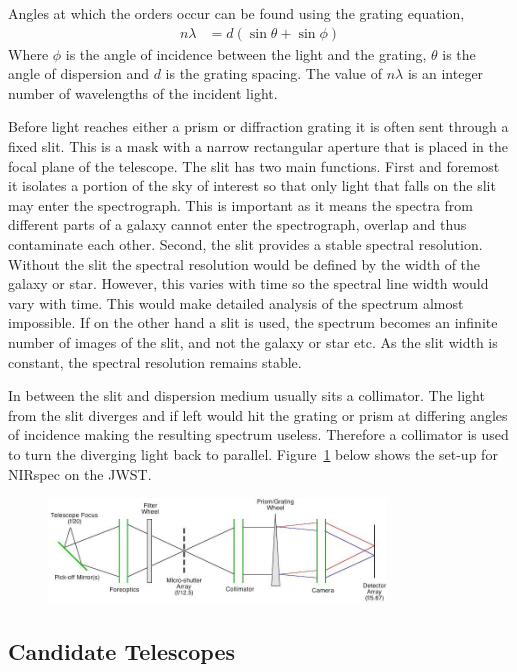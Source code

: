 	Angles at which the orders occur can be found using the grating equation,
	\begin{align}
		n\lambda &= d(\sin\theta + \sin\phi)
	\end{align}
	Where $\phi$ is the angle of incidence between the light and the grating, $\theta$ is the angle of dispersion and $d$ is the grating spacing. The value of $n\lambda$ is an integer number of wavelengths of the incident light.

	Before light reaches either a prism or diffraction grating it is often sent through a fixed slit. This is a mask with a narrow rectangular aperture that is placed in the focal plane of the telescope. The slit has two main functions. First and foremost it isolates a portion of the sky of interest so that only light that falls on the slit may enter the spectrograph. This is important as it means the spectra from different parts of a galaxy cannot enter the spectrograph, overlap and thus contaminate each other. Second, the slit provides a stable spectral resolution. Without the slit the spectral resolution would be defined by the width of the galaxy or star. However, this varies with time so the spectral line width would vary with time. This would make detailed analysis of the spectrum almost impossible. If on the other hand a slit is used, the spectrum becomes an infinite number of images of the slit, and not the galaxy or star etc. As the slit width is constant, the spectral resolution remains stable.

	In between the slit and dispersion medium usually sits a collimator. The light from the slit diverges and if left would hit the grating or prism at differing angles of incidence making the resulting spectrum useless. Therefore a collimator is used to turn the diverging light back to parallel. Figure~\ref{fig:nirspec_jwst} below shows the set-up for NIRspec on the JWST.
	\begin{figure}[!htbp]
		\centering
			\includegraphics[width=0.8\textwidth]{../Images/nirspec_jwst.jpeg}
		\caption{\label{fig:nirspec_jwst}}
	\end{figure}

	\subsection{Candidate Telescopes} %
	\label{sub:candidate_telescopes}
